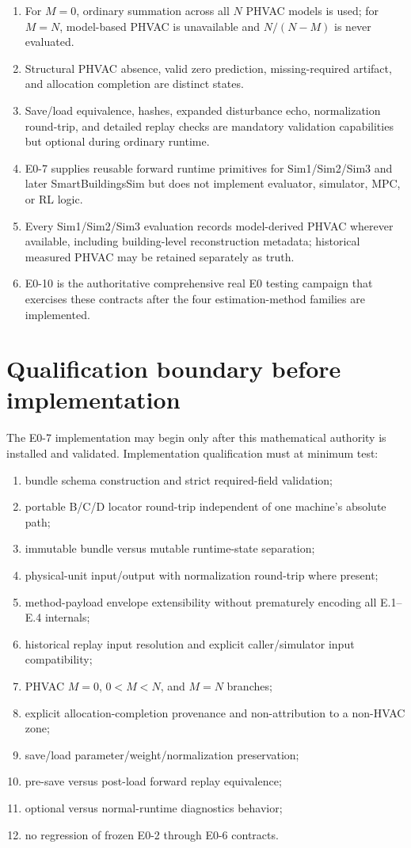 \documentclass[11pt]{article}
\begin{document}
\begin{enumerate}[leftmargin=1.8em]
\item For $M=0$, ordinary summation across all $N$ PHVAC models is used; for $M=N$, model-based PHVAC is unavailable and $N/(N-M)$ is never evaluated.
\item Structural PHVAC absence, valid zero prediction, missing-required artifact, and allocation completion are distinct states.
\item Save/load equivalence, hashes, expanded disturbance echo, normalization round-trip, and detailed replay checks are mandatory validation capabilities but optional during ordinary runtime.
\item E0-7 supplies reusable forward runtime primitives for Sim1/Sim2/Sim3 and later SmartBuildingsSim but does not implement evaluator, simulator, MPC, or RL logic.
\item Every Sim1/Sim2/Sim3 evaluation records model-derived PHVAC wherever available, including building-level reconstruction metadata; historical measured PHVAC may be retained separately as truth.
\item E0-10 is the authoritative comprehensive real E0 testing campaign that exercises these contracts after the four estimation-method families are implemented.
\end{enumerate}

\section{Qualification boundary before implementation}

The E0-7 implementation may begin only after this mathematical authority is
installed and validated. Implementation qualification must at minimum test:
\begin{enumerate}[leftmargin=1.8em]
\item bundle schema construction and strict required-field validation;
\item portable B/C/D locator round-trip independent of one machine's absolute path;
\item immutable bundle versus mutable runtime-state separation;
\item physical-unit input/output with normalization round-trip where present;
\item method-payload envelope extensibility without prematurely encoding all E.1--E.4 internals;
\item historical replay input resolution and explicit caller/simulator input compatibility;
\item PHVAC $M=0$, $0<M<N$, and $M=N$ branches;
\item explicit allocation-completion provenance and non-attribution to a non-HVAC zone;
\item save/load parameter/weight/normalization preservation;
\item pre-save versus post-load forward replay equivalence;
\item optional versus normal-runtime diagnostics behavior;
\item no regression of frozen E0-2 through E0-6 contracts.
\end{enumerate}



\end{document}

